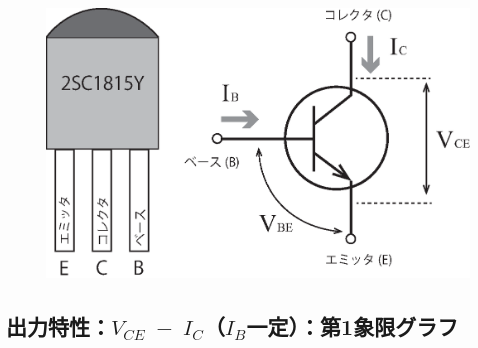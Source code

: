 \documentclass[uplatex,a4paper,11pt,oneside,openany]{jsbook}
\begin{document}

\begin{figure}[H]
	\centering
	\includegraphics[keepaspectratio, scale=0.6, angle=0]
	{figs/eps/illust.eps}
	\label{fig:illust}
\end{figure}

\newpage

\subsection{出力特性：$V_{CE}\;-\;I_C$（$I_B$一定）：第1象限グラフ}
\end{document}
